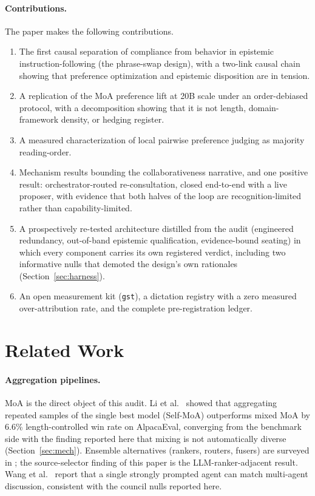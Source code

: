 \documentclass[11pt]{article}
\begin{document}
\paragraph{Contributions.} The paper makes the following contributions.
\begin{enumerate}
\item The first causal separation of compliance from behavior in
epistemic instruction-following (the phrase-swap design), with a
two-link causal chain showing that preference optimization and
epistemic disposition are in tension.
\item A replication of the MoA preference lift at 20B scale under an
order-debiased protocol, with a decomposition showing that it is not
length, domain-framework density, or hedging register.
\item A measured characterization of local pairwise preference judging
as majority reading-order.
\item Mechanism results bounding the collaborativeness narrative, and
one positive result: orchestrator-routed re-consultation, closed
end-to-end with a live proposer, with evidence that both halves of the
loop are recognition-limited rather than capability-limited.
\item A prospectively re-tested architecture distilled from the audit
(engineered redundancy, out-of-band epistemic qualification,
evidence-bound seating) in which every component carries its own
registered verdict, including two informative nulls that demoted the
design's own rationales (Section~\ref{sec:harness}).
\item An open measurement kit (\texttt{gst}), a dictation registry
with a zero measured over-attribution rate, and the complete
pre-registration ledger.
\end{enumerate}

\section{Related Work}
\label{sec:related}

\paragraph{Aggregation pipelines.} MoA \cite{wang2024moa} is the
direct object of this audit. Li et al.\ \cite{li2025selfmoa} showed
that aggregating repeated samples of the single best model (Self-MoA)
outperforms mixed MoA by 6.6\% length-controlled win rate on AlpacaEval,
converging from the benchmark side with the finding reported here that
mixing is not automatically diverse (Section~\ref{sec:mech}). Ensemble
alternatives (rankers, routers, fusers) are surveyed in
\cite{wang2024moa}; the source-selector finding of this paper is the
LLM-ranker-adjacent result. Wang et al.\ \cite{wang2024rebuttal}
report that a single strongly prompted agent can match multi-agent
discussion, consistent with the council nulls reported here.
\end{document}
